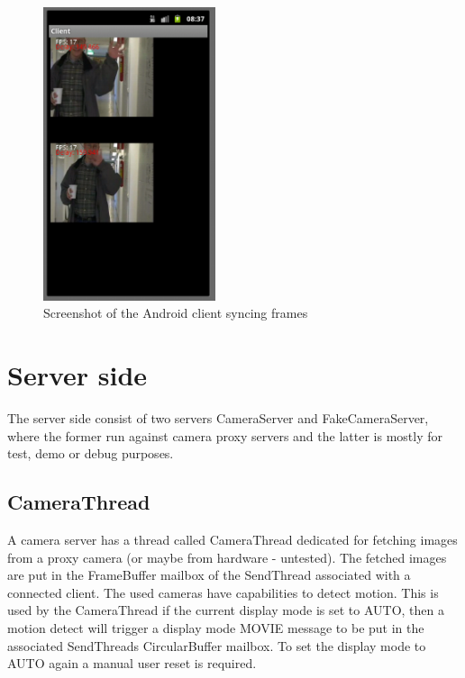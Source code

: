 \documentclass[8pt,titlepage]{article}
\begin{document}
\begin{figure}[hbp]
\includegraphics[width=0.45\textwidth]{../screenshots/androidSyncing.png}
\caption{Screenshot of the Android client syncing frames}
\end{figure}








\section{Server side}
The server side consist of two servers CameraServer and FakeCameraServer, where the former run against camera proxy servers and the latter is mostly for test, demo or debug purposes.



\subsection{CameraThread}
A camera server has a thread called CameraThread dedicated for fetching images from a proxy camera (or maybe from hardware - untested). The fetched images are put in the FrameBuffer mailbox of the SendThread associated with a connected client. The used cameras have capabilities to detect motion. This is used by the CameraThread if the current display mode is set to AUTO, then a motion detect will trigger a display mode MOVIE message to be put in the associated SendThreads CircularBuffer mailbox. To set the display mode to AUTO again a manual user reset is required. 
\end{document}
